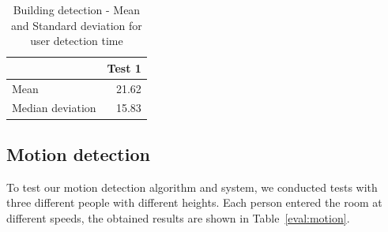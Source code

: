 
\begin{table}[]
\centering
\begin{tabular}{l|r|}
\cline{2-2}
 & \multicolumn{1}{l|}{Test 1} \\ \hline
\multicolumn{1}{|l|}{Mean} & 21.62 \\ \hline
\multicolumn{1}{|l|}{Median deviation} & 15.83 \\ \hline
\end{tabular}
\caption{Building detection  - Mean and Standard deviation for user detection time}
\label{eval:building2}
\end{table}



\subsection{Motion detection}

To test our motion detection algorithm and system, we conducted tests with three different people with different heights. Each person entered the room at different speeds, the obtained results are shown in Table~\ref{eval:motion}.

